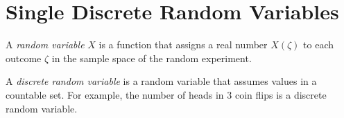 \section{Single Discrete Random Variables} \label{sec:Single Discrete Random Variables}
	\begin{definition} \label{def:Random Variable, Simple}
		A \emph{random variable} $X$ is a function that assigns a real number $X \left( \zeta \right)$ to each outcome $\zeta$ in the sample space of the random experiment.
	\end{definition}
	\begin{definition} \label{def:Discrete Random Variable}
		A \emph{discrete random variable} is a random variable that assumes values in a countable set. For example, the number of heads in 3 coin flips is a discrete random variable.
	\end{definition}


